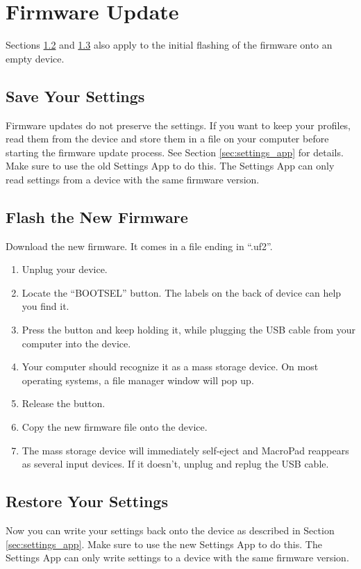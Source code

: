 \documentclass{article}
\newenvironment{note}{\begin{tcolorbox}[colback=blue!5!white,colframe=blue!75!black,title=\textbf{Note}]}{\end{tcolorbox}}
\begin{document}
\section{Firmware Update}\label{sec:firmwareupdate}
\begin{note}
Sections \ref{sec:flash} and \ref{sec:restoresettings} also apply to the initial flashing of the firmware onto an empty device.
\end{note}

\subsection{Save Your Settings}\label{sec:savesettings}
Firmware updates do not preserve the settings. If you want to keep your profiles, read them from the device and store them in a file on your computer before starting the firmware update process. See Section \ref{sec:settings_app} for details.
Make sure to use the old Settings App to do this. The Settings App can only read settings from a device with the same firmware version.

\subsection{Flash the New Firmware}\label{sec:flash}
Download the new firmware. It comes in a file ending in ``.uf2''.
\begin{enumerate}
\item Unplug your device.
\item Locate the ``BOOTSEL'' button. The labels on the back of device can help you find it.
\item Press the button and keep holding it, while plugging the USB cable from your computer into the device.
\item Your computer should recognize it as a mass storage device. On most operating systems, a file manager window will pop up.
\item Release the button.
\item Copy the new firmware file onto the device.
\item The mass storage device will immediately self-eject and MacroPad reappears as several input devices. If it doesn't, unplug and replug the USB cable.
\end{enumerate}

\subsection{Restore Your Settings}\label{sec:restoresettings}
Now you can write your settings back onto the device as described in Section \ref{sec:settings_app}.
Make sure to use the new Settings App to do this. The Settings App can only write settings to a device with the same firmware version.
\end{document}
